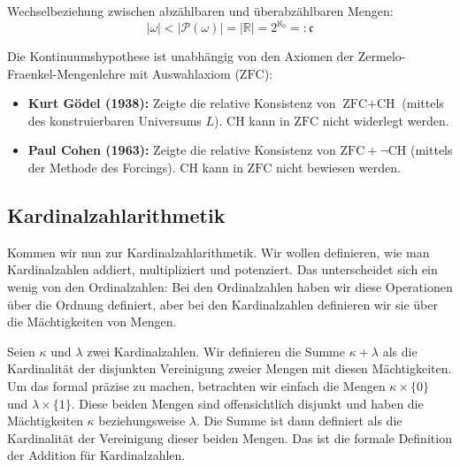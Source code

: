 \begin{math-stroke}
Wechselbeziehung zwischen abzählbaren und überabzählbaren Mengen:
\[
|\omega| < |\mathcal{P}(\omega)| = |\mathbb{R}| = 2^{\aleph_0} =: \mathfrak{c}
\]


\begin{explanation-of-steps}
Die Kontinuumshypothese ist unabhängig von den Axiomen der Zermelo-Fraenkel-Mengenlehre mit Auswahlaxiom ($\text{ZFC}$):
\begin{itemize}
    \item \textbf{Kurt Gödel (1938):} Zeigte die relative Konsistenz von $\text{ZFC} + \text{CH}$ (mittels des konstruierbaren Universums $L$). $\text{CH}$ kann in $\text{ZFC}$ nicht widerlegt werden.
    \item \textbf{Paul Cohen (1963):} Zeigte die relative Konsistenz von $\text{ZFC} + \neg\text{CH}$ (mittels der Methode des Forcings). $\text{CH}$ kann in $\text{ZFC}$ nicht bewiesen werden.
\end{itemize}
\end{explanation-of-steps}
\end{math-stroke}

\subsection{Kardinalzahlarithmetik}

\begin{spoken-clean}[01:07:21 - 01:09:45]
Kommen wir nun zur Kardinalzahlarithmetik. Wir wollen definieren, wie man Kardinalzahlen addiert, multipliziert und potenziert. Das unterscheidet sich ein wenig von den Ordinalzahlen: Bei den Ordinalzahlen haben wir diese Operationen über die Ordnung definiert, aber bei den Kardinalzahlen definieren wir sie über die Mächtigkeiten von Mengen.
\end{spoken-clean}

\begin{spoken-clean}[01:09:45 - 01:12:09]
Seien $\kappa$ und $\lambda$ zwei Kardinalzahlen. Wir definieren die Summe $\kappa + \lambda$ als die Kardinalität der disjunkten Vereinigung zweier Mengen mit diesen Mächtigkeiten. Um das formal präzise zu machen, betrachten wir einfach die Mengen $\kappa \times \{0\}$ und $\lambda \times \{1\}$. Diese beiden Mengen sind offensichtlich disjunkt und haben die Mächtigkeiten $\kappa$ beziehungsweise $\lambda$. Die Summe ist dann definiert als die Kardinalität der Vereinigung dieser beiden Mengen. Das ist die formale Definition der Addition für Kardinalzahlen.
\end{spoken-clean}

